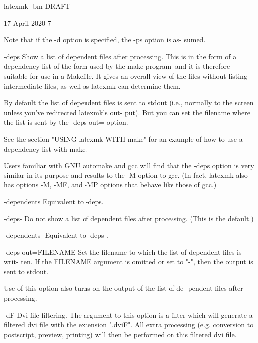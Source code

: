                   latexmk -bm DRAFT



                                 17 April 2020                               7








              Note  that  if the -d option is specified, the -ps option is as-
              sumed.


       -deps  Show a list of dependent files after processing.  This is in the
              form  of a dependency list of the form used by the make program,
              and it is therefore suitable for use in a Makefile.  It gives an
              overall view of the files without listing intermediate files, as
              well as latexmk can determine them.

              By default the list of dependent files is sent to stdout  (i.e.,
              normally  to  the screen unless you've redirected latexmk's out-
              put). But you can set the filename where the list is sent by the
              -deps-out= option.

              See  the section "USING latexmk WITH make" for an example of how
              to use a dependency list with make.

              Users familiar with GNU automake and  gcc  will  find  that  the
              -deps  option  is very similar in its purpose and results to the
              -M option to gcc.  (In fact, latexmk also has options  -M,  -MF,
              and -MP options that behave like those of gcc.)


       -dependents
              Equivalent to -deps.


       -deps- Do  not  show a list of dependent files after processing.  (This
              is the default.)


       -dependents-
              Equivalent to -deps-.


       -deps-out=FILENAME
              Set the filename to which the list of dependent files  is  writ-
              ten.   If  the  FILENAME argument is omitted or set to "-", then
              the output is sent to stdout.

              Use of this option also turns on the output of the list  of  de-
              pendent files after processing.


       -dF    Dvi  file  filtering.   The  argument to this option is a filter
              which will generate a  filtered  dvi  file  with  the  extension
              ".dviF".   All  extra processing (e.g. conversion to postscript,
              preview, printing) will then be performed on this  filtered  dvi
              file.

